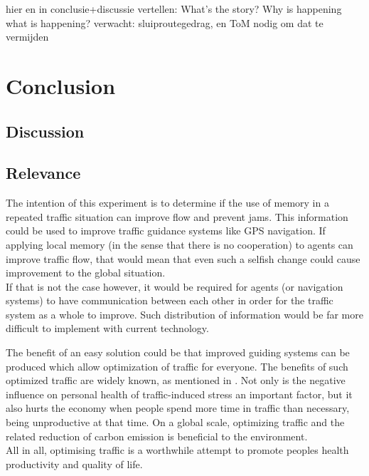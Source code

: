 \documentclass[a4paper,hidelinks]{article}
\begin{document}
hier en in conclusie+discussie vertellen: What's the story? Why is happening what is happening? verwacht: sluiproutegedrag, en ToM nodig om dat te vermijden

\section{Conclusion}
\subsection{Discussion}
\subsection{Relevance}
The intention of this experiment is to determine if the use of memory in a repeated traffic situation can improve flow and prevent jams. This information could be used to improve traffic guidance systems like GPS navigation. If applying local memory (in the sense that there is no cooperation) to agents can improve traffic flow, that would mean that even such a selfish change could cause improvement to the global situation. \\
If that is not the case however, it would be required for agents (or navigation systems) to have communication between each other in order for the traffic system as a whole to improve. Such distribution of information would be far more difficult to implement with current technology.

The benefit of an easy solution could be that improved guiding systems can be produced which allow optimization of traffic for everyone. The benefits of such optimized traffic are widely known, as mentioned in \cite{france2003multiagent}. Not only is the negative influence on personal health of traffic-induced stress an important factor, but it also hurts the economy when people spend more time in traffic than necessary, being unproductive at that time. On a global scale, optimizing traffic and the related reduction of carbon emission is beneficial to the environment. \\
All in all, optimising traffic is a worthwhile attempt to promote peoples health productivity and quality of life. 




\end{document}
